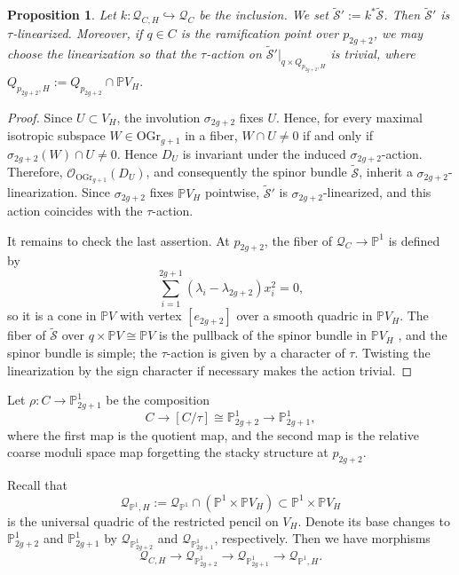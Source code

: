 \documentclass[12pt, letterpaper]{amsart}
\newtheorem{proposition}[theorem]{Proposition}
\theoremstyle{definition}
\newcommand{\PP}{\mathbb{P} }
\newcommand{\cO}{\mathcal{O} }
\newcommand{\cQ}{\mathcal{Q} }
\newcommand{\cS}{\mathcal{S} }
\newcommand{\tcS}{\widetilde{\cS} }
\def\OGr{\mathrm{OGr}}
\begin{document}
\begin{proposition} \label{prop:restricted_spinor_linearized}
Let \(k : \cQ_{C,H} \hookrightarrow \cQ_C\) be the inclusion. We set \(\tcS' := k^*\tcS\). Then \(\tcS'\) is \(\tau\)-linearized. Moreover, if \(q \in C\) is the ramification point over \(p_{2g+2}\), we may choose the linearization so that the \(\tau\)-action on \(\widetilde{\cS}'|_{q\times Q_{p_{2g+2},H}}\) is trivial, where \(Q_{p_{2g+2},H}:=Q_{p_{2g+2}}\cap\PP V_H.\)
\end{proposition}

\begin{proof}
Since \(U\subset V_H\), the involution \(\sigma_{2g+2}\) fixes \(U\). Hence, for every maximal isotropic subspace \(W \in \OGr_{g+1}\) in a fiber, \(W\cap U\ne 0\) if and only if \(\sigma_{2g+2}(W)\cap U\ne 0\). Hence \(D_U\) is invariant under the induced \(\sigma_{2g+2}\)-action. Therefore, \(\cO_{\OGr_{g+1}}(D_U)\), and consequently the spinor bundle \(\tcS\), inherit a \(\sigma_{2g+2}\)-linearization. Since \(\sigma_{2g+2}\) fixes \(\PP V_H\) pointwise, \(\tcS'\) is \(\sigma_{2g+2}\)-linearized, and this action coincides with the \(\tau\)-action.

It remains to check the last assertion. At \(p_{2g+2}\), the fiber of \(\cQ_C \to \PP^1\) is defined by
\[\sum_{i=1}^{2g+1}(\lambda_i-\lambda_{2g+2})x_i^2=0,\]
so it is a cone in \(\PP V \) with vertex \([e_{2g+2}]\) over a smooth quadric in \(\PP V_H\). The fiber of \(\tcS\) over \(q \times \PP V \cong \PP V\) is the pullback of the spinor bundle in \(\PP V_H\) \cite[p.24]{BO95}, and the spinor bundle is simple; the \(\tau\)-action is given by a character of \(\tau\). Twisting the linearization by the sign character if necessary makes the action trivial.
\end{proof}

Let \(\rho : C \to \PP_{2g+1}^1\) be the composition
\[C \to [C/\tau] \cong \PP_{2g+2}^1 \to \PP_{2g+1}^1,\]
where the first map is the quotient map, and the second map is the relative coarse moduli space map forgetting the stacky structure at \(p_{2g+2}\).

Recall that
\[\cQ_{\PP^1,H}:=\cQ_{\PP^1}\cap(\PP^1\times\PP V_H)\subset\PP^1\times\PP V_H\]
is the universal quadric of the restricted pencil on \(V_H\). Denote its base changes to \(\PP_{2g+2}^1\) and \(\PP_{2g+1}^1\) by \(\cQ_{\PP_{2g+2}^1}\) and \(\cQ_{\PP_{2g+1}^1}\), respectively. Then we have morphisms
\[\cQ_{C,H}\to\cQ_{\PP_{2g+2}^1}\to\cQ_{\PP_{2g+1}^1}\to\cQ_{\PP^1,H}.\]
\end{document}
